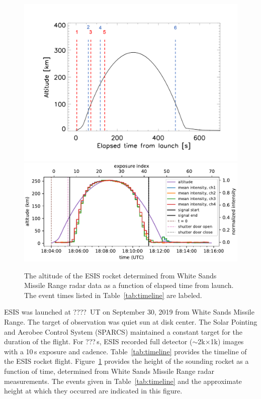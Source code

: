 		\begin{figure}[ht]
			\begin{center}
				\includegraphics{figures/altevents.png}
				\includegraphics[width=\textwidth]{figures/signal_and_altitude_vs_time}
				\caption{The altitude of the ESIS rocket determined from White Sands Missile Range radar data as a function of elapsed time from launch.  The event times listed in Table~\ref{tab:timeline} are labeled.}
				\label{fig:timeline}
			\end{center}
		\end{figure}


		ESIS was launched at ????~UT on September 30, 2019 from White Sands Missile Range.  The target of observation was quiet sun at disk center.  The Solar Pointing and Aerobee Control System (SPARCS) maintained a constant target for the duration of the flight.  For ???\,s, ESIS recorded full detector ($\sim$2k$\times$1k) images with a 10\,s exposure and cadence. %
		Table~\ref{tab:timeline} provides the timeline of the ESIS rocket flight. Figure~\ref{fig:timeline} provides the height of the sounding rocket as a function of time, determined from White Sands Missile Range radar measurements.  The events given in Table~\ref{tab:timeline} and the approximate height at which they occurred are indicated in this figure.


